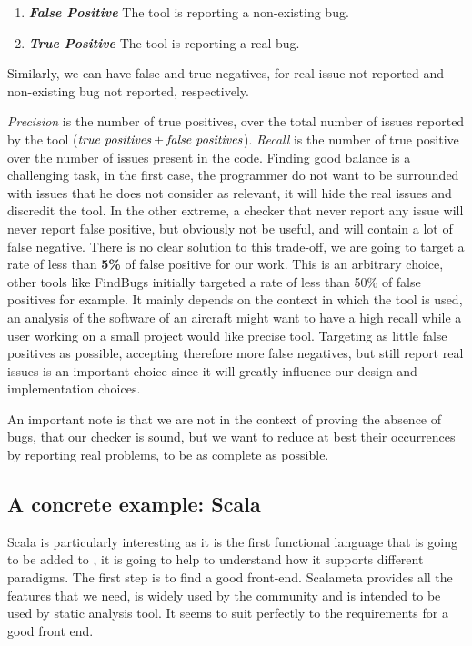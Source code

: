 \begin{enumerate}
	\item \textbf{\textit{False Positive}} \newline The tool is reporting a non-existing bug.
	\item \textbf{\textit{True Positive}} \newline The tool is reporting a real bug. 
\end{enumerate}
Similarly, we can have false and true negatives, for real issue not reported and non-existing bug not reported, respectively. 

\emph{Precision} is the number of true positives, over the total number of issues reported by the tool ($ \emph{true positives} + \emph{false positives} $). \emph{Recall} is the number of true positive over the number of issues present in the code. 
Finding good balance is a challenging task, in the first case, the programmer do not want to be surrounded with issues that he does not consider as relevant, it will hide the real issues and discredit the tool. 
In the other extreme, a checker that never report any issue will never report false positive, but obviously not be useful, and will contain a lot of false negative. 
There is no clear solution to this trade-off, we are going to target a rate of less than \textbf{5\%} of false positive for our work.
This is an arbitrary choice, other tools like FindBugs \cite{Hovemeyer:2004:FBE:1052883.1052895} initially targeted a rate of less than 50\% of false positives for example. 
It mainly depends on the context in which the tool is used, an analysis of the software of an aircraft might want to have a high recall while a user working on a small project would like precise tool. 
Targeting as little false positives as possible, accepting therefore more false negatives, but still report real issues is an important choice since it will greatly influence our design and implementation choices.

An important note is that we are not in the context of proving the absence of bugs, that our checker is sound, but we want to reduce at best their occurrences by reporting real problems, to be as complete as possible.

\subsection{A concrete example: Scala}
\label{subsec:concrete_example}

Scala is particularly interesting as it is the first functional language that is going to be added to \slang{}, it is going to help to understand how it supports different paradigms.
The first step is to find a good front-end.
Scalameta \cite{Scalameta:2019:Online} provides all the features that we need, is widely used by the community and is intended to be used by static analysis tool. 
It seems to suit perfectly to the requirements for a good front end.

